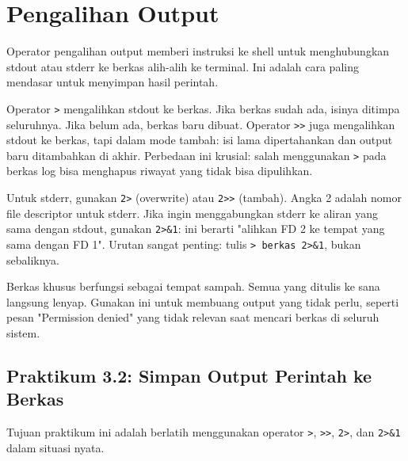 \section{Pengalihan Output}
\label{sec:io-redirection}

Operator pengalihan output memberi instruksi ke shell untuk menghubungkan stdout atau stderr ke berkas alih-alih ke terminal. Ini adalah cara paling mendasar untuk menyimpan hasil perintah.

Operator \texttt{>} mengalihkan stdout ke berkas. Jika berkas sudah ada, isinya ditimpa seluruhnya. Jika belum ada, berkas baru dibuat. Operator \texttt{>>} juga mengalihkan stdout ke berkas, tapi dalam mode tambah: isi lama dipertahankan dan output baru ditambahkan di akhir. Perbedaan ini krusial: salah menggunakan \texttt{>} pada berkas log bisa menghapus riwayat yang tidak bisa dipulihkan.

Untuk stderr, gunakan \texttt{2>} (overwrite) atau \texttt{2>>} (tambah). Angka 2 adalah nomor file descriptor untuk stderr. Jika ingin menggabungkan stderr ke aliran yang sama dengan stdout, gunakan \texttt{2>\&1}: ini berarti "alihkan FD 2 ke tempat yang sama dengan FD 1". Urutan sangat penting: tulis \texttt{> berkas 2>\&1}, bukan sebaliknya.

Berkas khusus  berfungsi sebagai tempat sampah. Semua yang ditulis ke sana langsung lenyap. Gunakan ini untuk membuang output yang tidak perlu, seperti pesan "Permission denied" yang tidak relevan saat mencari berkas di seluruh sistem.

\subsection*{Praktikum 3.2: Simpan Output Perintah ke Berkas}

Tujuan praktikum ini adalah berlatih menggunakan operator \texttt{>}, \texttt{>>}, \texttt{2>}, dan \texttt{2>\&1} dalam situasi nyata.

